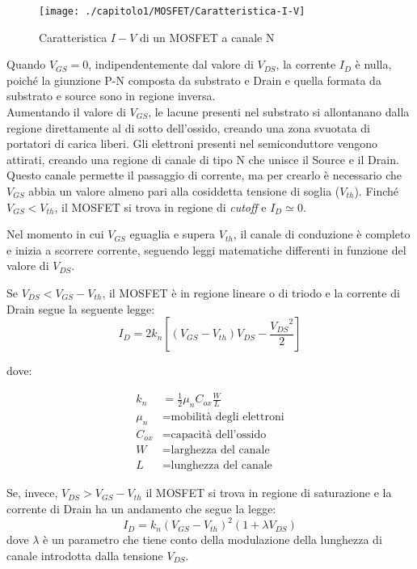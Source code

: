 \begin{figure}[h]
  \centering
  \texttt{[image: ./capitolo1/MOSFET/Caratteristica-I-V]}
  \caption[Caratteristica $I-V$ di un MOSFET a canale N]{Caratteristica $I-V$ di un MOSFET a canale N}
  \label{fig:caratteristica-I-V}
\end{figure}

Quando $V_{GS} = 0$, indipendentemente dal valore di $V_{DS}$, la corrente $I_D$ è nulla, poiché la giunzione P-N composta da substrato e Drain e quella formata da substrato e source sono in regione inversa. \\
Aumentando il valore di $V_{GS}$, le lacune presenti nel substrato si allontanano dalla regione direttamente al di sotto dell'ossido, creando una
zona svuotata di portatori di carica liberi. Gli elettroni presenti nel semiconduttore
vengono attirati, creando una regione di canale di tipo N che unisce il
Source e il Drain. Questo canale permette il passaggio di corrente, ma per crearlo è necessario che $V_{GS}$ abbia un valore almeno pari alla cosiddetta tensione di soglia ($V_{th}$). Finché $V_{GS} < V_{th}$, il MOSFET si trova in regione di \emph{cutoff} e $I_D \simeq 0$.

Nel momento in cui $V_{GS}$ eguaglia e supera $V_{th}$, il canale di conduzione è completo e inizia a scorrere corrente, seguendo leggi matematiche differenti in funzione del valore di $V_{DS}$.

\vspace*{0.5cm}

Se $V_{DS} < V_{GS} -  V_{th}$, il MOSFET è in regione lineare o di triodo e la corrente di Drain segue la seguente legge:\\

\begin{equation}
  I_D = 2k_n\left[ \left(V_{GS}-V_{th}\right)V_{DS} - \frac{{V_{DS}}^2}{2}\right]
\end{equation}

dove:

\begin{align*}
   k_n &= \frac{1}{2}\mu_n C_{ox}\frac{W}{L} \\
   \mu_n &= \text{mobilità degli elettroni} \\
   C_{ox} &= \text{capacità dell'ossido} \\
   W &= \text{larghezza del canale} \\
   L &= \text{lunghezza del canale}
\end{align*}

Se, invece, $V_{DS} > V_{GS} -  V_{th}$ il MOSFET si trova in regione di saturazione e la corrente di Drain ha un andamento che segue la legge:\\
\begin{equation}
  I_D = k_n\left(V_{GS}-V_{th}\right)^2 (1+\lambda V_{DS})
\end{equation}
dove $\lambda$ è un parametro che tiene conto della modulazione della lunghezza di canale introdotta dalla tensione $V_{DS}$.\\

